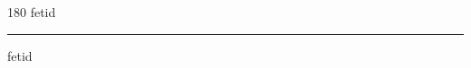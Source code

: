 
\begin{frame}
\begin{center}
\begin{turn}{180}
{\fontsize{2.5cm}{1em}\selectfont fetid}
\end{turn}
\vspace{1em}\par  
\hrule
\vspace{1em}\par  
{\fontsize{2.5cm}{1em}\selectfont fetid}
\end{center}
\end{frame}

